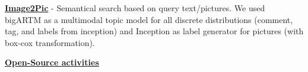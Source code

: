


\begin{cventries}




\cventry
{} %
{} %
{} %
{} %
{ %
\begin{cvitems}
\item {\href{https://github.com/menshikh-iv/image2pic}{\textbf{Image2Pic}} - Semantical search based on query text/pictures. We used bigARTM as a multimodal topic model for all discrete distributions (comment, tag, and labels from inception) and Inception as label generator for pictures (with box-cox transformation).}
\item {\href{https://github.com/menshikh-iv}{\textbf{Open-Source activities}}}
\end{cvitems}
}

\end{cventries}